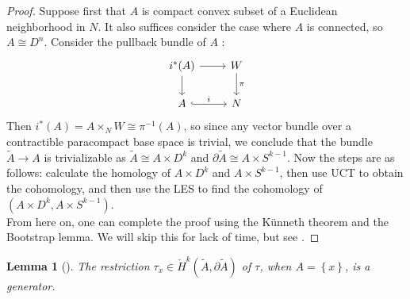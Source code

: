 \documentclass[reqno]{amsart}
\newtheorem{lemma}[theorem]{Lemma}
\theoremstyle{definition}
\theoremstyle{remark}
\begin{document}
\begin{proof}
    Suppose first that
    $A$ is compact convex subset
    of a Euclidean neighborhood in $N$. It also
    suffices consider the case where $A$ is connected,
    so $A \cong D^{n}$.
    Consider the pullback bundle of $A$ :
    \begin{equation*}
    \begin{tikzcd}
        i^{*}(A) \ar[r] \ar[d] & W \ar[d, "\pi"] \\
        A \ar[r, hookrightarrow, "i"] & N
    \end{tikzcd}
    \end{equation*}
    Then
    $i^{*}(A) =
    A \times_{N} W \cong
    \pi^{-1}(A)$, so
    since any vector bundle over a contractible paracompact
    base space is trivial, we conclude that 
    the bundle
    $\tilde{A} \to A$ is trivializable as
    $\tilde{A} \cong A \times D^{k}$ 
    and $\partial \tilde{A} \cong
    A \times S^{k-1}$.
    Now the steps are as follows: calculate
    the homology of 
    $A \times D^{k} $ and
    $A \times S^{k-1} $, then use UCT to obtain
    the cohomology, and then use the LES to find the cohomology
    of
    $\left( A \times D^{k}, A \times S^{k-1} \right) $.\\
    From here on, one can complete the proof using the
    Künneth theorem and the Bootstrap lemma.
    We will skip this for lack of time, but see \cite[Lemma 11.4]{Bredon}.
\end{proof}


\begin{lemma}[]\label{Lemma:NICVN}
    The restriction $\tau_x \in 
    \check{H}^{k}( \tilde{A}, \partial \tilde{A})$ of
    $\tau$, when $A = \left\{ x \right\} $, is a 
    generator.
\end{lemma}
\end{document}
